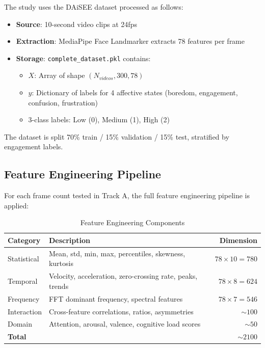 \documentclass[11pt,a4paper]{article}
\begin{document}
The study uses the DAiSEE dataset processed as follows:

\begin{itemize}
  \item \textbf{Source}: 10-second video clips at 24fps
  \item \textbf{Extraction}: MediaPipe Face Landmarker extracts 78 features per frame
  \item \textbf{Storage}: \texttt{complete\_dataset.pkl} contains:
    \begin{itemize}
      \item $X$: Array of shape $(N_{videos}, 300, 78)$
      \item $y$: Dictionary of labels for 4 affective states (boredom, engagement, confusion, frustration)
      \item 3-class labels: Low (0), Medium (1), High (2)
    \end{itemize}
\end{itemize}

The dataset is split 70\% train / 15\% validation / 15\% test, stratified by engagement labels.

\subsection{Feature Engineering Pipeline}

For each frame count tested in Track A, the full feature engineering pipeline is applied:

\begin{table}[H]
  \centering
  \caption{Feature Engineering Components}
  \label{tab:feature-engineering}
  \begin{tabular}{@{}llr@{}}
    \toprule
    \textbf{Category} & \textbf{Description} & \textbf{Dimension} \\
    \midrule
    Statistical & Mean, std, min, max, percentiles, skewness, kurtosis & $78 \times 10 = 780$ \\
    Temporal & Velocity, acceleration, zero-crossing rate, peaks, trends & $78 \times 8 = 624$ \\
    Frequency & FFT dominant frequency, spectral features & $78 \times 7 = 546$ \\
    Interaction & Cross-feature correlations, ratios, asymmetries & $\sim 100$ \\
    Domain & Attention, arousal, valence, cognitive load scores & $\sim 50$ \\
    \midrule
    \textbf{Total} & & $\sim 2100$ \\
    \bottomrule
  \end{tabular}
\end{table}
\end{document}
